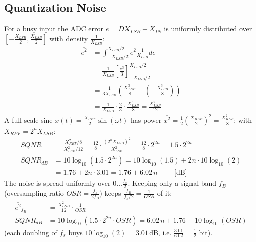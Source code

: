 \subsection{Quantization Noise}
For a busy input the ADC error \(e = D X_{LSB} - X_{IN}\) is uniformly
distributed over \(\left[-\frac{X_{LSB}}{2}, \frac{X_{LSB}}{2}\right]\) with
density \(\frac{1}{X_{LSB}}\):
\begin{align*}
  \overline{e^2} &= \int_{-X_{LSB}/2}^{X_{LSB}/2} e^2 \frac{1}{X_{LSB}} de \\
  &= \frac{1}{X_{LSB}} \left[\frac{e^3}{3}\right]_{-X_{LSB}/2}^{X_{LSB}/2} \\
  &= \frac{1}{3 X_{LSB}} \left(\frac{X_{LSB}^3}{8} - \left(-\frac{X_{LSB}^3}{8}\right)\right) \\
  &= \frac{1}{X_{LSB}} \cdot \frac{2}{3} \cdot \frac{X_{LSB}^3}{8} = \frac{X_{LSB}^2}{12}
\end{align*}
A full scale sine \(x(t) = \frac{X_{REF}}{2}\sin(\omega t)\) has power
\(\overline{x^2} = \frac{1}{2}\left(\frac{X_{REF}}{2}\right)^2 = \frac{X_{REF}^2}{8}\);
with \(X_{REF} = 2^n X_{LSB}\):
\begin{align*}
  SQNR &= \frac{X_{REF}^2 / 8}{X_{LSB}^2 / 12} = \frac{12}{8} \cdot \frac{\left(2^n X_{LSB}\right)^2}{X_{LSB}^2} = \frac{12}{8} \cdot 2^{2n} = 1.5 \cdot 2^{2n} \\
  SQNR_{dB} &= 10\log_{10}\left(1.5 \cdot 2^{2n}\right) = 10\log_{10}(1.5) + 2n \cdot 10\log_{10}(2) \\
  &= 1.76 + 2n \cdot 3.01 = 1.76 + 6.02\, n \hspace{1cm} \text{[dB]}
\end{align*}
The noise is spread uniformly over \(0 \ldots \frac{f_s}{2}\). Keeping only a
signal band \(f_B\) (oversampling ratio \(OSR = \frac{f_s}{2 f_B}\)) keeps
\(\frac{f_B}{f_s/2} = \frac{1}{OSR}\) of it:
\begin{align*}
  \overline{e^2}_{f_B} &= \frac{X_{LSB}^2}{12} \cdot \frac{1}{OSR} \\
  SQNR_{dB} &= 10\log_{10}\left(1.5 \cdot 2^{2n} \cdot OSR\right) = 6.02\, n + 1.76 + 10\log_{10}(OSR)
\end{align*}
(each doubling of \(f_s\) buys \(10\log_{10}(2) = 3.01\,\)dB, i.e.
\(\frac{3.01}{6.02} = \frac{1}{2}\) bit).

